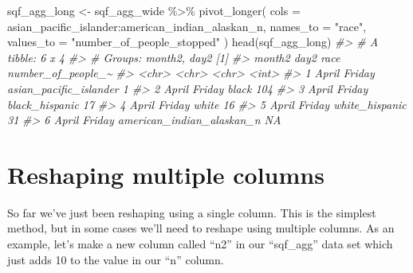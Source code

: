 \documentclass[
]{krantz}
\makeatletter
\newenvironment{Shaded}{\begin{snugshade}}{\end{snugshade}}
\newcommand{\AttributeTok}[1]{\textcolor[rgb]{0.61,0.61,0.61}{#1}}
\newcommand{\CommentTok}[1]{\textcolor[rgb]{0.37,0.37,0.37}{\textit{#1}}}
\newcommand{\DecValTok}[1]{\textcolor[rgb]{0.06,0.06,0.06}{#1}}
\newcommand{\FunctionTok}[1]{\textcolor[rgb]{0,0,0}{#1}}
\newcommand{\NormalTok}[1]{#1}
\newcommand{\OtherTok}[1]{\textcolor[rgb]{0.37,0.37,0.37}{#1}}
\newcommand{\SpecialCharTok}[1]{\textcolor[rgb]{0,0,0}{#1}}
\newcommand{\StringTok}[1]{\textcolor[rgb]{0.5,0.5,0.5}{#1}}
\newenvironment{kframe}{%
\medskip{}
\setlength{\fboxsep}{.8em}
 \def\at@end@of@kframe{}%
 \ifinner\ifhmode%
  \def\at@end@of@kframe{\end{minipage}}%
  \begin{minipage}{\columnwidth}%
 \fi\fi%
 \def\FrameCommand##1{\hskip\@totalleftmargin \hskip-\fboxsep
 \colorbox{shadecolor}{##1}\hskip-\fboxsep
     \hskip-\linewidth \hskip-\@totalleftmargin \hskip\columnwidth}%
 \MakeFramed {\advance\hsize-\width
   \@totalleftmargin\z@ \linewidth\hsize
   \@setminipage}}%
 {\par\unskip\endMakeFramed%
 \at@end@of@kframe}
\renewenvironment{Shaded}{\begin{kframe}}{\end{kframe}}
\makeatother
\begin{document}
\begin{Shaded}
\begin{Highlighting}[]
\NormalTok{sqf\_agg\_long }\OtherTok{\textless{}{-}}\NormalTok{ sqf\_agg\_wide }\SpecialCharTok{\%\textgreater{}\%}
  \FunctionTok{pivot\_longer}\NormalTok{(}
    \AttributeTok{cols =}\NormalTok{ asian\_pacific\_islander}\SpecialCharTok{:}\NormalTok{american\_indian\_alaskan\_n,}
    \AttributeTok{names\_to =} \StringTok{"race"}\NormalTok{,}
    \AttributeTok{values\_to =} \StringTok{"number\_of\_people\_stopped"}
\NormalTok{  )}
\FunctionTok{head}\NormalTok{(sqf\_agg\_long)}
\CommentTok{\#\textgreater{} \# A tibble: 6 x 4}
\CommentTok{\#\textgreater{} \# Groups:   month2, day2 [1]}
\CommentTok{\#\textgreater{}   month2 day2   race                      number\_of\_people\_\textasciitilde{}}
\CommentTok{\#\textgreater{}   \textless{}chr\textgreater{}  \textless{}chr\textgreater{}  \textless{}chr\textgreater{}                                  \textless{}int\textgreater{}}
\CommentTok{\#\textgreater{} 1 April  Friday asian\_pacific\_islander                     1}
\CommentTok{\#\textgreater{} 2 April  Friday black                                    104}
\CommentTok{\#\textgreater{} 3 April  Friday black\_hispanic                            17}
\CommentTok{\#\textgreater{} 4 April  Friday white                                     16}
\CommentTok{\#\textgreater{} 5 April  Friday white\_hispanic                            31}
\CommentTok{\#\textgreater{} 6 April  Friday american\_indian\_alaskan\_n                 NA}
\end{Highlighting}
\end{Shaded}

\hypertarget{reshaping-multiple-columns}{%
\section{Reshaping multiple
columns}\label{reshaping-multiple-columns}}

So far we've just been reshaping using a single column. This
is the simplest method, but in some cases we'll need to
reshape using multiple columns. As an example, let's make a
new column called ``n2'' in our ``sqf\_agg'' data set which
just adds 10 to the value in our ``n'' column.

\begin{Shaded}
\end{Shaded}
\end{document}
